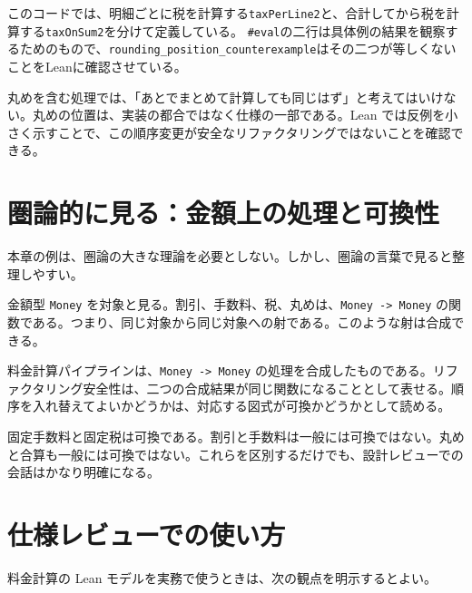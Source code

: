 このコードでは、明細ごとに税を計算する\texttt{taxPerLine2}と、合計してから税を計算する\texttt{taxOnSum2}を分けて定義している。
\texttt{\#eval}の二行は具体例の結果を観察するためのもので、\texttt{rounding\_position\_counterexample}はその二つが等しくないことをLeanに確認させている。


\begin{warningbox}
丸めを含む処理では、「あとでまとめて計算しても同じはず」と考えてはいけない。丸めの位置は、実装の都合ではなく仕様の一部である。Lean では反例を小さく示すことで、この順序変更が安全なリファクタリングではないことを確認できる。
\end{warningbox}

\section{圏論的に見る：金額上の処理と可換性}

本章の例は、圏論の大きな理論を必要としない。しかし、圏論の言葉で見ると整理しやすい。

金額型 \texttt{Money} を対象と見る。割引、手数料、税、丸めは、\texttt{Money -> Money} の関数である。つまり、同じ対象から同じ対象への射である。このような射は合成できる。

\begin{softwarebox}
料金計算パイプラインは、\texttt{Money -> Money} の処理を合成したものである。リファクタリング安全性は、二つの合成結果が同じ関数になることとして表せる。順序を入れ替えてよいかどうかは、対応する図式が可換かどうかとして読める。
\end{softwarebox}

固定手数料と固定税は可換である。割引と手数料は一般には可換ではない。丸めと合算も一般には可換ではない。これらを区別するだけでも、設計レビューでの会話はかなり明確になる。

\section{仕様レビューでの使い方}

料金計算の Lean モデルを実務で使うときは、次の観点を明示するとよい。

